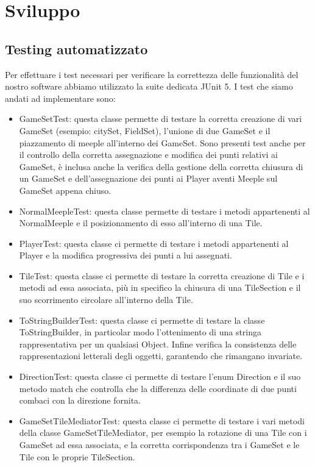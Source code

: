 \section{Sviluppo}
\subsection{Testing automatizzato}
Per effettuare i test necessari per verificare la correttezza delle funzionalità del nostro software abbiamo utilizzato la suite dedicata JUnit 5. I test che siamo andati ad implementare sono:
\begin{itemize}
    \item GameSetTest: questa classe permette di testare la corretta creazione di vari GameSet (esempio: citySet, FieldSet), l'unione di due GameSet e il piazzamento di meeple all'interno dei GameSet. Sono presenti test anche per il controllo della corretta assegnazione e modifica dei punti relativi ai GameSet, è inclusa anche la verifica della gestione della corretta chiusura di un GameSet e dell'assegnazione dei punti ai Player aventi Meeple sul GameSet appena chiuso.
    \item NormalMeepleTest: questa classe permette di testare i metodi appartenenti al NormalMeeple e il posizionamento di esso all'interno di una Tile.
    \item PlayerTest: questa classe ci permette di testare i metodi appartenenti al Player e la modifica progressiva dei punti a lui assegnati.
    \item TileTest: questa classe ci permette di testare la corretta creazione di Tile e i metodi ad essa associata, più in specifico la chiusura di una TileSection e il suo scorrimento circolare all'interno della Tile.
    \item ToStringBuilderTest: questa classe ci permette di testare la classe ToStringBuilder, in particolar modo l'ottenimento di una stringa rappresentativa per un qualsiasi Object. Infine verifica la consistenza delle rappresentazioni letterali degli oggetti, garantendo che rimangano invariate.
    \item DirectionTest: questa classe ci permette di testare l'enum Direction e il suo metodo match che controlla che la differenza delle coordinate di due punti combaci con la direzione fornita.
    \item GameSetTileMediatorTest: questa classe ci permette di testare i vari metodi della classe GameSetTileMediator, per esempio la rotazione di una Tile con i GameSet ad essa associata, e la corretta corrispondenza tra i GameSet e le Tile con le proprie TileSection.
\end{itemize}

